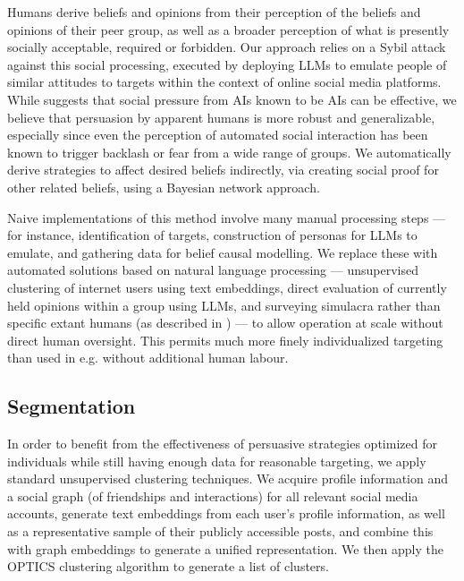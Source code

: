 \documentclass[11pt]{article}
\begin{document}
Humans derive beliefs and opinions from their perception of the beliefs and opinions of their peer group\cite{Cialdini2004}\cite{Deutsch1955ASO}, as well as a broader perception of what is presently socially acceptable, required or forbidden. Our approach relies on a Sybil attack\cite{6547122} against this social processing, executed by deploying LLMs to emulate people of similar attitudes to targets within the context of online social media platforms. While \cite{bocian2024moral} suggests that social pressure from AIs known to be AIs can be effective, we believe that persuasion by apparent humans is more robust and generalizable, especially since even the perception of automated social interaction has been known to trigger backlash or fear from a wide range of groups\cite{doi:10.1080/0144929X.2023.2276801}\cite{Yan2023}. We automatically derive strategies to affect desired beliefs indirectly, via creating social proof for other related beliefs, using a Bayesian network approach.

Naive implementations of this method involve many manual processing steps --- for instance, identification of targets, construction of personas for LLMs to emulate, and gathering data for belief causal modelling. We replace these with automated solutions based on natural language processing --- unsupervised clustering of internet users using text embeddings, direct evaluation of currently held opinions within a group using LLMs, and surveying simulacra rather than specific extant humans (as described in \cite{Argyle_2023}) --- to allow operation at scale without direct human oversight. This permits much more finely individualized targeting than used in e.g. \cite{10.1093/pnasnexus/pgae035} without additional human labour.

\subsection{Segmentation}

In order to benefit from the effectiveness of persuasive strategies optimized for individuals while still having enough data for reasonable targeting, we apply standard unsupervised clustering techniques. We acquire profile information and a social graph (of friendships and interactions) for all relevant social media accounts, generate text embeddings from each user's profile information, as well as a representative sample of their publicly accessible posts, and combine this with graph embeddings to generate a unified representation. We then apply the OPTICS clustering algorithm\cite{DBLP:conf/sigmod/AnkerstBKS99} to generate a list of clusters.
\end{document}
